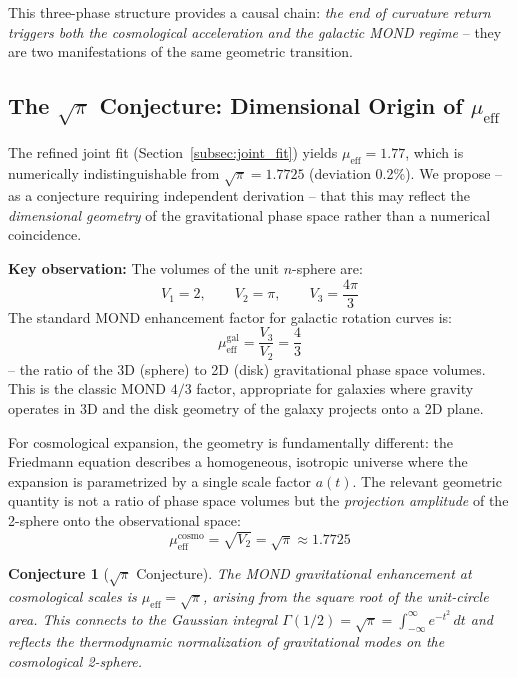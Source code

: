 \documentclass[aps,prd,twocolumn,superscriptaddress,nofootinbib]{revtex4-2}
\newtheorem{conjecture}{Conjecture}
\begin{document}
This three-phase structure provides a causal chain: \textit{the end of curvature return triggers both the cosmological acceleration and the galactic MOND regime} -- they are two manifestations of the same geometric transition.


\subsection{The $\sqrt{\pi}$ Conjecture: Dimensional Origin of $\mu_{\mathrm{eff}}$}
\label{subsec:sqrt_pi}

The refined joint fit (Section~\ref{subsec:joint_fit}) yields $\mu_{\mathrm{eff}} = 1.77$, which is numerically indistinguishable from $\sqrt{\pi} = 1.7725$ (deviation 0.2\%). We propose -- as a conjecture requiring independent derivation -- that this may reflect the \textit{dimensional geometry} of the gravitational phase space rather than a numerical coincidence.

\textbf{Key observation:} The volumes of the unit $n$-sphere are:
\begin{equation}
V_1 = 2, \qquad V_2 = \pi, \qquad V_3 = \frac{4\pi}{3}
\end{equation}
The standard MOND enhancement factor for galactic rotation curves is:
\begin{equation}
\mu_{\mathrm{eff}}^{\mathrm{gal}} = \frac{V_3}{V_2} = \frac{4}{3}
\label{eq:mu_gal}
\end{equation}
-- the ratio of the 3D (sphere) to 2D (disk) gravitational phase space volumes. This is the classic MOND $4/3$ factor, appropriate for galaxies where gravity operates in 3D and the disk geometry of the galaxy projects onto a 2D plane.

For cosmological expansion, the geometry is fundamentally different: the Friedmann equation describes a homogeneous, isotropic universe where the expansion is parametrized by a single scale factor $a(t)$. The relevant geometric quantity is not a ratio of phase space volumes but the \textit{projection amplitude} of the 2-sphere onto the observational space:
\begin{equation}
\mu_{\mathrm{eff}}^{\mathrm{cosmo}} = \sqrt{V_2} = \sqrt{\pi} \approx 1.7725
\label{eq:mu_cosmo}
\end{equation}

\begin{conjecture}[$\sqrt{\pi}$ Conjecture]
The MOND gravitational enhancement at cosmological scales is $\mu_{\mathrm{eff}} = \sqrt{\pi}$, arising from the square root of the unit-circle area. This connects to the Gaussian integral $\Gamma(1/2) = \sqrt{\pi} = \int_{-\infty}^{\infty} e^{-t^2}\,dt$ and reflects the thermodynamic normalization of gravitational modes on the cosmological 2-sphere.
\end{conjecture}
\end{document}
